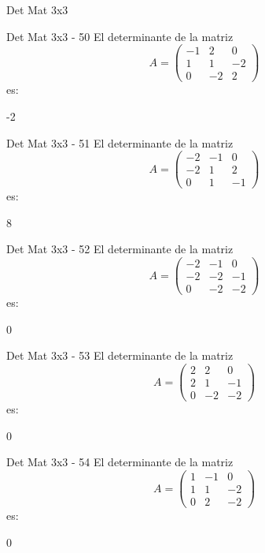 \documentclass[a4,11pt]{aleph-notas}
\begin{document}
\begin{quiz}{Det Mat 3x3}
\begin{numerical}[tolerance=0]%
    {Det Mat 3x3 - 50}
    El determinante de la matriz
    \[
        A = \begin{pmatrix} -1 & 2 & 0 \\ 1 & 1 & -2 \\ 0 & -2 & 2 \end{pmatrix}
    \]
    es:
    \item[] -2
\end{numerical}

\begin{numerical}[tolerance=0]%
    {Det Mat 3x3 - 51}
    El determinante de la matriz
    \[
        A = \begin{pmatrix} -2 & -1 & 0 \\ -2 & 1 & 2 \\ 0 & 1 & -1 \end{pmatrix}
    \]
    es:
    \item[] 8
\end{numerical}

\begin{numerical}[tolerance=0]%
    {Det Mat 3x3 - 52}
    El determinante de la matriz
    \[
        A = \begin{pmatrix} -2 & -1 & 0 \\ -2 & -2 & -1 \\ 0 & -2 & -2 \end{pmatrix}
    \]
    es:
    \item[] 0
\end{numerical}

\begin{numerical}[tolerance=0]%
    {Det Mat 3x3 - 53}
    El determinante de la matriz
    \[
        A = \begin{pmatrix} 2 & 2 & 0 \\ 2 & 1 & -1 \\ 0 & -2 & -2 \end{pmatrix}
    \]
    es:
    \item[] 0
\end{numerical}

\begin{numerical}[tolerance=0]%
    {Det Mat 3x3 - 54}
    El determinante de la matriz
    \[
        A = \begin{pmatrix} 1 & -1 & 0 \\ 1 & 1 & -2 \\ 0 & 2 & -2 \end{pmatrix}
    \]
    es:
    \item[] 0
\end{numerical}


\end{quiz}
\end{document}

